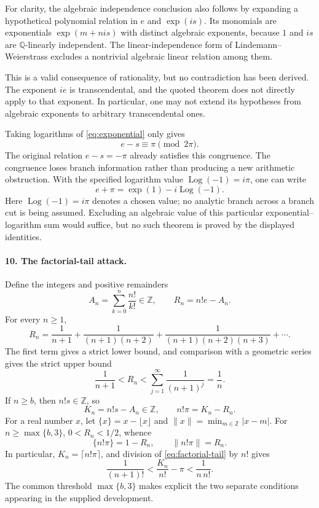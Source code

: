 \documentclass[11pt]{article}
\newcommand{\Q}{\mathbb Q}
\newcommand{\Z}{\mathbb Z}
\DeclareMathOperator{\Log}{Log}
\begin{document}
For clarity, the algebraic independence conclusion also follows by
expanding a hypothetical polynomial relation in $e$ and $\exp(is)$.
Its monomials are exponentials $\exp(m+nis)$ with distinct algebraic
exponents, because $1$ and $is$ are $\Q$-linearly independent. The
linear-independence form of Lindemann--Weierstrass excludes a nontrivial
algebraic linear relation among them.

This is a valid consequence of rationality, but no contradiction has been
derived. The exponent $ie$ is transcendental, and the quoted theorem does
not directly apply to that exponent. In particular, one may not extend its
hypotheses from algebraic exponents to arbitrary transcendental ones.

Taking logarithms of \eqref{eq:exponential} only gives
\[
 e-s\equiv\pi\pmod{2\pi}.
\]
The original relation $e-s=-\pi$ already satisfies this congruence. The
congruence loses branch information rather than producing a new
arithmetic obstruction. With the specified logarithm value
$\Log(-1)=i\pi$, one can write
\begin{equation}\label{eq:mixed-exp-log}
 e+\pi=\exp(1)-i\Log(-1).
\end{equation}
Here $\Log(-1)=i\pi$ denotes a chosen value; no analytic branch across a
branch cut is being assumed. Excluding an algebraic value of this
particular exponential--logarithm sum would suffice, but no such theorem
is proved by the displayed identities.

\paragraph{10. The factorial-tail attack.}
Define the integers and positive remainders
\begin{equation}\label{eq:factorial-setup}
 A_n=\sum_{k=0}^n\frac{n!}{k!}\in\Z,\qquad
 R_n=n!e-A_n.
\end{equation}
For every $n\ge1$,
\[
 R_n=\frac1{n+1}+\frac1{(n+1)(n+2)}
       +\frac1{(n+1)(n+2)(n+3)}+\cdots.
\]
The first term gives a strict lower bound, and comparison with a geometric
series gives the strict upper bound
\begin{equation}\label{eq:factorial-tail}
 \boxed{\frac1{n+1}<R_n<\sum_{j=1}^{\infty}\frac1{(n+1)^j}=\frac1n.}
\end{equation}
If $n\ge b$, then $n!s\in\Z$, so
\begin{equation}\label{eq:K-definition}
 K_n=n!s-A_n\in\Z,\qquad n!\pi=K_n-R_n.
\end{equation}
For a real number $x$, let $\{x\}=x-\lfloor x\rfloor$ and
$\|x\|=\min_{m\in\Z}|x-m|$. For $n\ge\max\{b,3\}$,
$0<R_n<1/2$, whence
\begin{equation}\label{eq:fingerprint}
 \boxed{\{n!\pi\}=1-R_n,\qquad \|n!\pi\|=R_n.}
\end{equation}
In particular, $K_n=\lceil n!\pi\rceil$, and division of
\eqref{eq:factorial-tail} by $n!$ gives
\begin{equation}\label{eq:factorial-approx}
 \boxed{\frac1{(n+1)!}<\frac{K_n}{n!}-\pi<\frac1{n\,n!}.}
\end{equation}
The common threshold $\max\{b,3\}$ makes explicit the two separate
conditions appearing in the supplied development.
\end{document}

